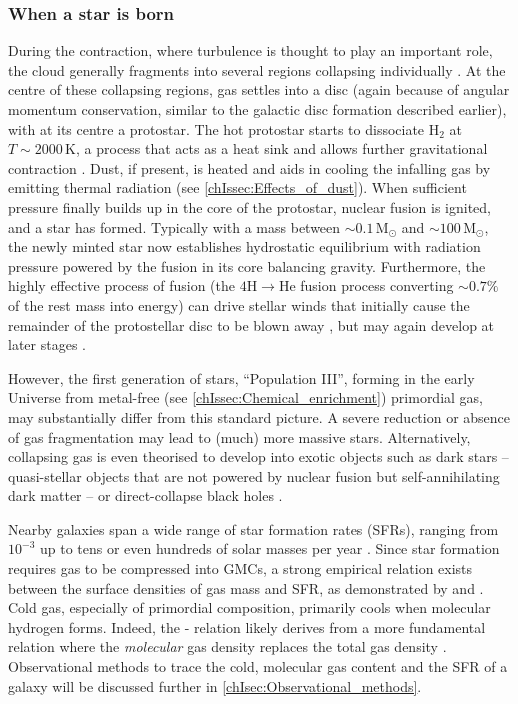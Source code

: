 \subsubsection{When a star is born}
\label{chIsssec:When_a_star_is_born}

During the contraction, where turbulence is thought to play an important role, the cloud generally fragments into several regions collapsing individually \citep[e.g.][]{2007ARA&A..45..565M}. At the centre of these collapsing regions, gas settles into a disc (again because of angular momentum conservation, similar to the galactic disc formation described earlier), with at its centre a protostar. The hot protostar starts to dissociate $\text{H}_2$ at $T \sim 2000 \, \mathrm{K}$, a process that acts as a heat sink and allows further gravitational contraction \citep{2010gfe..book.....M}. Dust, if present, is heated and aids in cooling the infalling gas by emitting thermal radiation (see \cref{chIssec:Effects_of_dust}). When sufficient pressure finally builds up in the core of the protostar, nuclear fusion is ignited, and a star has formed. Typically with a mass between $\sim 0.1 \, \mathrm{M_\odot}$ and $\sim 100 \, \mathrm{M_\odot}$, the newly minted star now establishes hydrostatic equilibrium with radiation pressure powered by the fusion in its core balancing gravity. Furthermore, the highly effective process of fusion (the $4\text{H} \rightarrow \text{He}$ fusion process converting $\sim 0.7\%$ of the rest mass into energy) can drive stellar winds that initially cause the remainder of the protostellar disc to be blown away \citep{2007ARA&A..45..565M}, but may again develop at later stages \citep{1999isw..book.....L}.

However, the first generation of stars, ``Population III'', forming in the early Universe from metal-free (see \cref{chIssec:Chemical_enrichment}) primordial gas, may substantially differ from this standard picture. A severe reduction or absence of gas fragmentation may lead to (much) more massive stars. Alternatively, collapsing gas is even theorised to develop into exotic objects such as dark stars -- quasi-stellar objects that are not powered by nuclear fusion but self-annihilating dark matter -- or direct-collapse black holes \citep{2013RPPh...76k2901B}.

Nearby galaxies span a wide range of star formation rates (SFRs), ranging from $10^{-3}$ up to tens or even hundreds of solar masses per year \citep{2012ARA&A..50..531K}. Since star formation requires gas to be compressed into GMCs, a strong empirical relation exists between the surface densities of gas mass and SFR, as demonstrated by \citet{1959ApJ...129..243S} and \citet{1989ApJ...344..685K, 1998ApJ...498..541K}. Cold gas, especially of primordial composition, primarily cools when molecular hydrogen forms. Indeed, the \citeauthor{1959ApJ...129..243S}-\citeauthor{1989ApJ...344..685K} relation likely derives from a more fundamental relation where the \textit{molecular} gas density replaces the total gas density \citep[e.g.][]{2022MNRAS.510.3622B}. Observational methods to trace the cold, molecular gas content and the SFR of a galaxy will be discussed further in \cref{chIsec:Observational_methods}.

